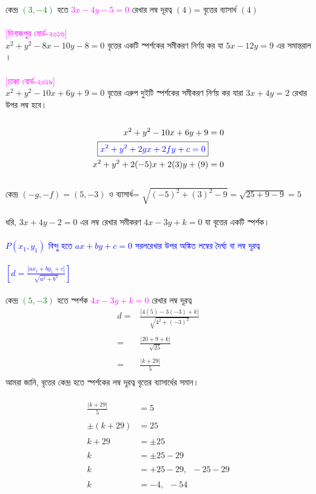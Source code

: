 \documentclass{article}
\begin{document}
কেন্দ্র \textcolor{green}{$(3,-4)$} হতে \textcolor{magenta}{$3x-4y-5=0$}  রেখার লম্ব দূরত্ব $(4)$= বৃত্তের ব্যাসার্ধ $(4)$\\
\\ 
\textcolor{magenta}{[দিনাজপুর বোর্ড-২০১৬]}\\ 
$x^2+y^2-8x-10y-8=0$ বৃত্তের একটি স্পর্শকের সমীকরণ নির্ণয় কর যা $5x-12y=9$ এর সমান্তরাল । \\ 
\\ 
\textcolor{magenta}{[ঢাকা বোর্ড-২০১৯]}\\ 
$x^2+y^2-10x+6y+9=0$ বৃত্তের এরুপ দুইটি স্পর্শকের সমীকরণ নির্ণয় কর যারা   $3x+4y=2$ রেখার উপর লম্ব হবে। \\ 
\\ 
	\begin{align*}
x^2+y^2-10x+6y+9&=0\\
	\boxed{\textcolor{blue}{x^2+y^2+2gx+2fy+c=0}}&\\
	x^2+y^2+2(-5)x+2(3)y+(9)&=0
\end{align*}
\\
কেন্দ্র 	$(-g,-f)=(5,-3)$ ও ব্যাসার্ধ= $\sqrt{(-5)^2+(3)^2-9}=\sqrt{25+9-9}=5$\\
\\ 
ধরি,  $3x+4y-2=0$ এর লম্ব রেখার সমীকরণ  $4x-3y+k=0$ যা বৃত্তের একটি স্পর্শক।\\
\\  
\textcolor{blue}{$P(x_1,y_1)$ বিন্দু হতে  $ax+by+c=0$ সরলরেখার উপর অঙ্কিত লম্বের দৈর্ঘ্য বা লম্ব দূরত্ব \\
	\\
	$\left[d=\frac{|ax_1+by_1+c|}{\sqrt{a^2+b^2}}\right]$}\\
\\
কেন্দ্র \textcolor{green}{$(5,-3)$} হতে স্পর্শক \textcolor{magenta}{$4x-3y+k=0$}  রেখার লম্ব দূরত্ব \\
\begin{align*}
	d=	&\frac{|4(5)-3(-3)+k|}{\sqrt{4^2+(-3)^2}}\\
	\\
	=	&	\frac{|20+9+k|}{\sqrt{25}}\\
	\\
	=	&	\frac{|k+29|}{5}\\
\end{align*}
আমরা জানি, বৃত্তের কেন্দ্র হতে স্পর্শকের লম্ব দূরত্ব বৃত্তের ব্যাসার্ধের সমান। \\
\\ 
\begin{align*}
	\frac{|k+29|}{5}&=5\\
	\\
	\pm (k+29)&=25\\
	\\
	k+29&=\pm 25\\
	\\
	k&=\pm 25-29\\
	\\
	k&=+25-29,\,\,\,-25-29\\
	\\
	k&=-4,\,\,\,-54
\end{align*}
\end{document}
